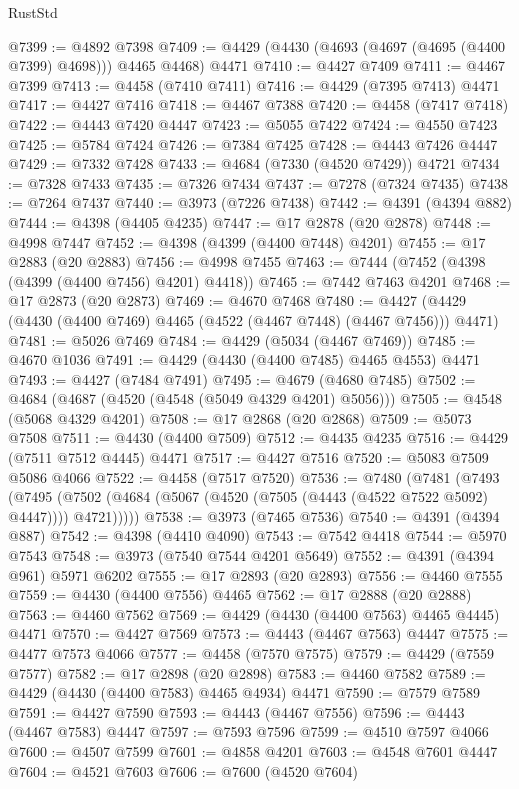 \begin{lexlean}{RustStd}
\begin{coremodule}
{\begin{coremodule}
{{{{{{{{{{{{{{{{{{{{{{{{{{{{{{{{{{{{{{{{{{{{{{{{{{{{{{{{{{{{{{{{{{{{@7399 := @4892 @7398
@7409 := @4429 (@4430 (@4693 (@4697 (@4695 (@4400 @7399) @4698))) @4465 @4468) @4471
@7410 := @4427 @7409
@7411 := @4467 @7399
@7413 := @4458 (@7410 @7411)
@7416 := @4429 (@7395 @7413) @4471
@7417 := @4427 @7416
@7418 := @4467 @7388
@7420 := @4458 (@7417 @7418)
@7422 := @4443 @7420 @4447
@7423 := @5055 @7422
@7424 := @4550 @7423
@7425 := @5784 @7424
@7426 := @7384 @7425
@7428 := @4443 @7426 @4447
@7429 := @7332 @7428
@7433 := @4684 (@7330 (@4520 @7429)) @4721
@7434 := @7328 @7433
@7435 := @7326 @7434
@7437 := @7278 (@7324 @7435)
@7438 := @7264 @7437
@7440 := @3973 (@7226 @7438)
@7442 := @4391 (@4394 @882)
@7444 := @4398 (@4405 @4235)
@7447 := @17 @2878 (@20 @2878)
@7448 := @4998 @7447
@7452 := @4398 (@4399 (@4400 @7448) @4201)
@7455 := @17 @2883 (@20 @2883)
@7456 := @4998 @7455
@7463 := @7444 (@7452 (@4398 (@4399 (@4400 @7456) @4201) @4418))
@7465 := @7442 @7463 @4201
@7468 := @17 @2873 (@20 @2873)
@7469 := @4670 @7468
@7480 := @4427 (@4429 (@4430 (@4400 @7469) @4465 (@4522 (@4467 @7448) (@4467 @7456))) @4471)
@7481 := @5026 @7469
@7484 := @4429 (@5034 (@4467 @7469))
@7485 := @4670 @1036
@7491 := @4429 (@4430 (@4400 @7485) @4465 @4553) @4471
@7493 := @4427 (@7484 @7491)
@7495 := @4679 (@4680 @7485)
@7502 := @4684 (@4687 (@4520 (@4548 (@5049 @4329 @4201) @5056)))
@7505 := @4548 (@5068 @4329 @4201)
@7508 := @17 @2868 (@20 @2868)
@7509 := @5073 @7508
@7511 := @4430 (@4400 @7509)
@7512 := @4435 @4235
@7516 := @4429 (@7511 @7512 @4445) @4471
@7517 := @4427 @7516
@7520 := @5083 @7509 @5086 @4066
@7522 := @4458 (@7517 @7520)
@7536 := @7480
    (@7481
      (@7493
        (@7495 (@7502 (@4684 (@5067 (@4520 (@7505 (@4443 (@4522 @7522 @5092) @4447)))) @4721)))))
@7538 := @3973 (@7465 @7536)
@7540 := @4391 (@4394 @887)
@7542 := @4398 (@4410 @4090)
@7543 := @7542 @4418
@7544 := @5970 @7543
@7548 := @3973 (@7540 @7544 @4201 @5649)
@7552 := @4391 (@4394 @961) @5971 @6202
@7555 := @17 @2893 (@20 @2893)
@7556 := @4460 @7555
@7559 := @4430 (@4400 @7556) @4465
@7562 := @17 @2888 (@20 @2888)
@7563 := @4460 @7562
@7569 := @4429 (@4430 (@4400 @7563) @4465 @4445) @4471
@7570 := @4427 @7569
@7573 := @4443 (@4467 @7563) @4447
@7575 := @4477 @7573 @4066
@7577 := @4458 (@7570 @7575)
@7579 := @4429 (@7559 @7577)
@7582 := @17 @2898 (@20 @2898)
@7583 := @4460 @7582
@7589 := @4429 (@4430 (@4400 @7583) @4465 @4934) @4471
@7590 := @7579 @7589
@7591 := @4427 @7590
@7593 := @4443 (@4467 @7556)
@7596 := @4443 (@4467 @7583) @4447
@7597 := @7593 @7596
@7599 := @4510 @7597 @4066
@7600 := @4507 @7599
@7601 := @4858 @4201
@7603 := @4548 @7601 @4447
@7604 := @4521 @7603
@7606 := @7600 (@4520 @7604)
}}}}}}}}}}}}}}}}}}}}}}}}}}}}}}}}}}}}}}}}}}}}}}}}}}}}}}}}}}}}}}}}}}}}
\end{coremodule}}
\end{coremodule}
\end{lexlean}
